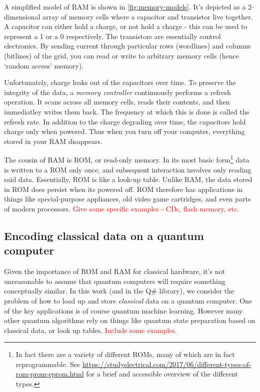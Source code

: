\documentclass[a4paper,12pt]{article}
\newcommand\todo[1]{\textcolor{red}{#1}}
\begin{document}
A simplified model of RAM is shown in \autoref{fig:memory-models}. 
It's depicted as a 2-dimensional array of memory cells where a capacitor and transistor live together. 
A capacitor can either hold a charge, or not hold a charge - this can be used to represent a 1 or a 0 respectively. 
The transistors are essentially control electronics. 
By sending current through particular rows (wordlines) and columns (bitlines) of the grid, you can read or write to arbitrary memory cells (hence `random access' memory).


Unfortunately, charge leaks out of the capacitors over time.
To preserve the integrity of the data, a \emph{memory controller} continuously performs a refresh operation.
It scans across all memory cells, reads their contents, and then immediatley writes them back.
The frequency at which this is done is called the refresh rate.
In addition to the charge degrading over time, the capacitors hold charge only when powered.
Thus when you turn off your computer, everything stored in your RAM disappears.

The cousin of RAM is ROM, or read-only memory.
In its most basic form\footnote{In fact there are a variety of different ROMs, many of which are in fact reprogrammable. See \url{
https://studyelectrical.com/2017/06/different-types-of-rom-prom-eprom.html} for a brief and accessible overview of the different types.} data is written to a ROM only once, and subsequent interaction involves only reading said data.
Essentially, ROM is like a look-up table.
Unlike RAM, the data stored in ROM does persist when its powered off. 
ROM therefore has applications in things like special-purpose appliances, old video game cartridges, and even parts of modern processors.
\todo{Give some specific examples - CDs, flash memory, etc.}

\subsection{Encoding classical data on a quantum computer}
\label{sec:encoding}

Given the importance of ROM and RAM for classical hardware, it's not unreasonable to assume that quantum computers will require something conceptually similar.
In this work (and in the Q\# library), we consider the problem of how to load up and store \emph{classical} data on a quantum computer.
One of the key applications is of course quantum machine learning.
However many other quantum algorithms rely on things like quantum state preparation based on classical data, or look up tables.
\todo{Include some examples.}
\end{document}
